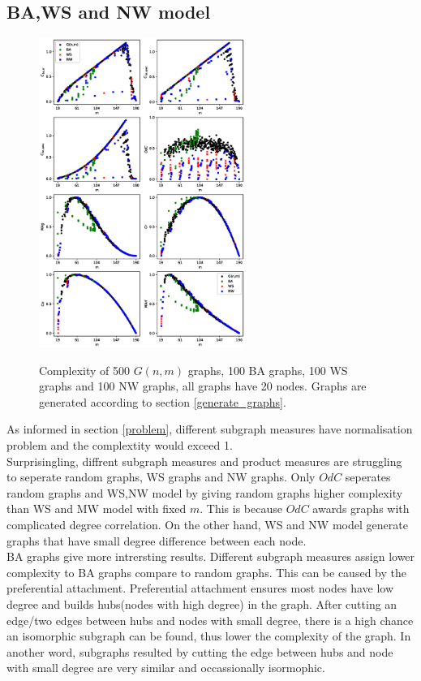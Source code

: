 \documentclass[12pt]{article}
\begin{document}
\subsection{BA,WS and NW model}
\begin{figure}[ht]
    \centering
    \includegraphics[width = 0.6\textwidth]{complexities_sp.eps}
    \label{fig:graph_models}
    \caption{Complexity of 500 $G(n,m)$ graphs, 100 BA graphs, 100 WS graphs and 100 NW graphs, all graphs have 20 nodes. Graphs are generated according to section \ref{generate_graphs}.}
\end{figure}
As informed in section \ref{problem}, different subgraph measures have normalisation problem and the complextity would exceed 1.\\
Surprisingling, diffrent subgraph measures and product measures are struggling to seperate random graphs, WS graphs and NW graphs. Only $OdC$ seperates random graphs and WS,NW model by giving random graphs higher complexity than WS and MW model with fixed $m$. This is because $OdC$ awards graphs with complicated degree correlation. On the other hand, WS and NW model generate graphs that have small degree difference between each node.\\
BA graphs give more intrersting results. Different subgraph measures assign lower complexity to BA graphs compare to random graphs. This can be caused by the preferential attachment. Preferential attachment ensures most nodes have low degree and builds hubs(nodes with high degree) in the graph. After cutting an edge/two edges between hubs and nodes with small degree, there is a high chance an isomorphic subgraph can be found, thus lower the complexity of the graph. In another word, subgraphs resulted by cutting the edge between hubs and node with small degree are very similar and occassionally isormophic.\\
\end{document}

